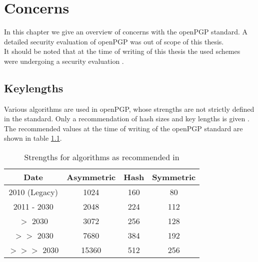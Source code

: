 \chapter{Concerns} \label{chapter:concerns}


In this chapter we give an overview of concerns with the openPGP standard.
A detailed security evaluation of openPGP was out of scope of this thesis. \\

It should be noted that at the time of writing of this thesis the used schemes were undergoing a security evaluation \citep{TUB2015}.



\section{Keylengths}

Various algorithms are used in openPGP, whose strengths are not strictly defined in the standard. 
Only a recommendation of hash sizes and key lengths is given \citep[section 14]{RFC4880}.
The recommended values at the time of writing of the openPGP standard are shown in table \ref{tab:keylengths}.

\begin{table}[h]
	\centering
	\begin{tabular}{|c|c|c|c|}
		\hline Date & 			Asymmetric & Hash & Symmetric \\ 
		\hline\hline 2010 (Legacy) & 1024 & 160 & 80 \\ 
		\hline 2011 - 2030 & 2048 & 224 & 112 \\ 
		\hline $>$ 2030 		   & 3072 & 256 & 128 \\ 
		\hline $>>$ 2030       & 7680 & 384 & 192 \\ 
		\hline $>>>$ 2030     & 15360 & 512 & 256 \\ 
		\hline 
	\end{tabular}
	\label{tab:keylengths}
	\caption{Strengths for algorithms as recommended in \citep[section 14]{RFC4880}} 
\end{table}

